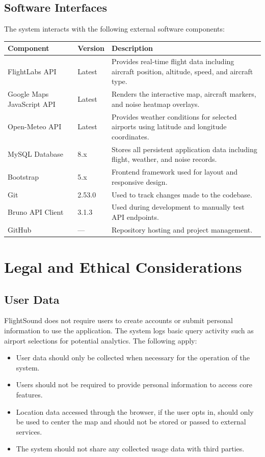 \documentclass[12pt]{article}
\begin{document}
\subsection{Software Interfaces}
The system interacts with the following external software components:

\begin{tabular}{|l|l|p{6.5cm}|}
\hline
Component & Version & Description \\
\hline
FlightLabs API & Latest & Provides real-time flight data including aircraft position, altitude, speed, and aircraft type. \\
\hline
Google Maps JavaScript API & Latest & Renders the interactive map, aircraft markers, and noise heatmap overlays. \\
\hline
Open-Meteo API & Latest & Provides weather conditions for selected airports using latitude and longitude coordinates. \\
\hline
MySQL Database & 8.x & Stores all persistent application data including flight, weather, and noise records. \\
\hline
Bootstrap & 5.x & Frontend framework used for layout and responsive design. \\
\hline
Git & 2.53.0 & Used to track changes made to the codebase. \\
\hline
Bruno API Client & 3.1.3 & Used during development to manually test API endpoints. \\
\hline
GitHub & --- & Repository hosting and project management. \\
\hline
\end{tabular}

\newpage

\section{Legal and Ethical Considerations}

\subsection{User Data}
FlightSound does not require users to create accounts or submit personal information to use the application. The system logs basic query activity such as airport selections for potential analytics. The following apply:

\begin{itemize}
\item User data should only be collected when necessary for the operation of the system.
\item Users should not be required to provide personal information to access core features.
\item Location data accessed through the browser, if the user opts in, should only be used to center the map and should not be stored or passed to external services.
\item The system should not share any collected usage data with third parties.
\end{itemize}
\end{document}
